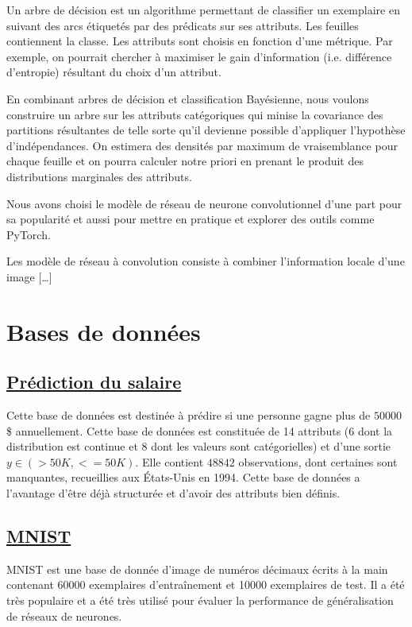 \documentclass[12pt,letterpaper]{article}
\begin{document}
Un arbre de décision est un algorithme permettant de classifier un exemplaire
en suivant des arcs étiquetés par des prédicats sur ses attributs. Les feuilles
contiennent la classe.  Les attributs sont choisis en fonction d'une métrique.
Par exemple, on pourrait chercher à maximiser le gain d'information (i.e.
différence d'entropie) résultant du choix d'un attribut.

En combinant arbres de décision et classification Bayésienne, nous voulons
construire un arbre sur les attributs catégoriques qui minise la covariance des
partitions résultantes de telle sorte qu'il devienne possible d'appliquer
l'hypothèse d'indépendances. On estimera des densités par maximum de
vraisemblance pour chaque feuille et on pourra calculer notre priori en prenant
le produit des distributions marginales des attributs.

Nous avons choisi le modèle de réseau de neurone convolutionnel d'une part pour
sa popularité et aussi pour mettre en pratique et explorer des outils comme
PyTorch.

Les modèle de réseau à convolution consiste à combiner l'information locale
d'une image [\dots]

\section{Bases de données}
\subsection{\href{http://archive.ics.uci.edu/ml/datasets/Adult}{Prédiction du salaire}}

Cette base de données est destinée à prédire si une personne gagne plus
de $50 000$\$ annuellement. Cette base de données est constituée de 14 attributs
(6 dont la distribution est continue et 8 dont les valeurs sont catégorielles)
et d'une sortie $y \in \left( >50K, <=50K \right)$. Elle contient $48 842$
observations, dont certaines sont manquantes, recueillies aux États-Unis en
1994. Cette base de données a l'avantage d'être déjà structurée et d'avoir des
attributs bien définis.

\subsection{\href{http://yann.lecun.com/exdb/mnist/}{MNIST}}

MNIST est une base de donnée d'image de numéros décimaux écrits à la main
contenant 60000 exemplaires d'entraînement et 10000 exemplaires de test. Il a
été très populaire et a été très utilisé pour évaluer la performance de
généralisation de réseaux de neurones. 
\end{document}
